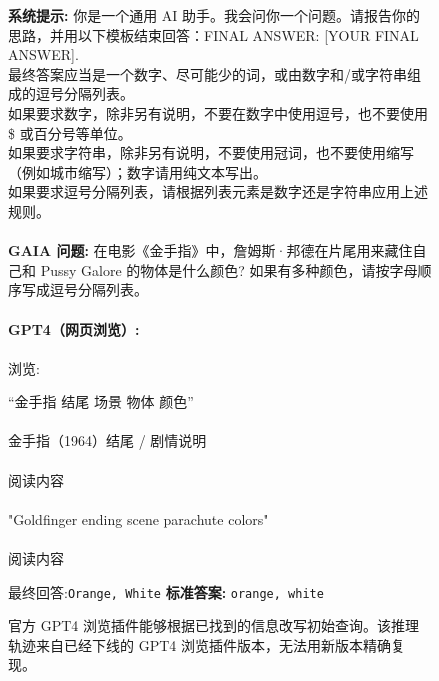 \documentclass{fairmeta}
\newcommand{\benchmark}{\textsc{GAIA}}
\begin{document}
\begin{figure}[h!]
 \small
 \centering
 \begin{tcolorbox}[colframe=RoyalBlue, colback=white]
 \textbf{系统提示:} 你是一个通用 AI 助手。我会问你一个问题。请报告你的思路，并用以下模板结束回答：FINAL ANSWER: [YOUR FINAL ANSWER].\\
 最终答案应当是一个数字、尽可能少的词，或由数字和/或字符串组成的逗号分隔列表。\\
 如果要求数字，除非另有说明，不要在数字中使用逗号，也不要使用 \$ 或百分号等单位。\\
 如果要求字符串，除非另有说明，不要使用冠词，也不要使用缩写（例如城市缩写）；数字请用纯文本写出。\\
 如果要求逗号分隔列表，请根据列表元素是数字还是字符串应用上述规则。
 \\
 \\
 \textbf{\benchmark{} 问题:} 在电影《金手指》中，詹姆斯·邦德在片尾用来藏住自己和 Pussy Galore 的物体是什么颜色? 如果有多种颜色，请按字母顺序写成逗号分隔列表。
 \\
 \\
 \textbf{GPT4（网页浏览）:} 
 \\
 \\ 浏览:
 \begin{tcolorbox}[colframe=RoyalBlue, colback=gray!10]
 \faSearch \hspace{.1cm} “金手指 结尾 场景 物体 颜色”\\
 \\
 \faMousePointer \hspace{.1cm} 金手指（1964）结尾 / 剧情说明\\
 \\
 \faNavicon \hspace{.1cm} 阅读内容\\
 \\
 \faSearch \hspace{.1cm} "Goldfinger ending scene parachute colors"\\
 \\
 \faNavicon \hspace{.1cm} 阅读内容
 \end{tcolorbox}
最终回答:\texttt{Orange, White} \hspace{.5cm}\textbf{标准答案:} \texttt{orange, white} \textcolor{Green}{{\Large \checkmark}}


 \end{tcolorbox}
 \caption{官方 GPT4 浏览插件能够根据已找到的信息改写初始查询。该推理轨迹来自已经下线的 GPT4 浏览插件版本，无法用新版本精确复现。}
 \label{fig:demo_gpt4_goldfinger}
\end{figure}
\end{document}
